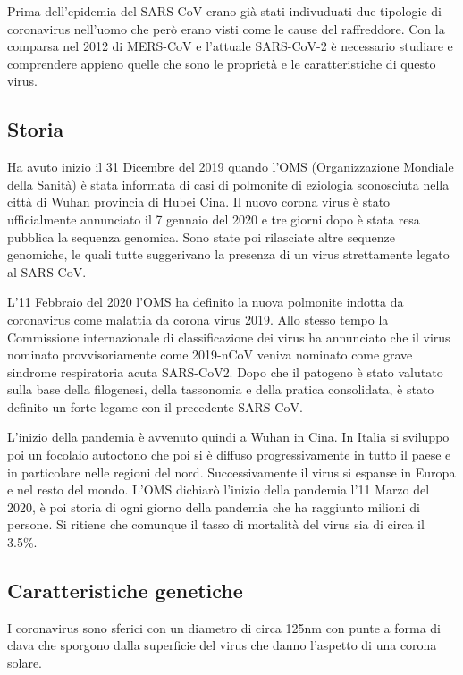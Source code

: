 Prima dell'epidemia del SARS-CoV erano già stati indivuduati due tipologie di coronavirus nell'uomo che però erano visti come le cause del raffreddore. Con la comparsa
nel 2012 di MERS-CoV e l'attuale SARS-CoV-2 è necessario studiare e comprendere appieno quelle che sono le proprietà e le caratteristiche di questo virus. 

\subsection{Storia}\label{subsec:es_subsec}
Ha avuto inizio il 31 Dicembre del 2019 quando l'OMS (Organizzazione Mondiale della Sanità) è stata informata di casi di polmonite di eziologia sconosciuta nella città di Wuhan provincia di Hubei Cina. Il nuovo corona virus è stato ufficialmente annunciato il 7 gennaio del 2020 e tre giorni dopo è stata resa pubblica la sequenza genomica. Sono state poi rilasciate altre sequenze genomiche, le quali tutte suggerivano la presenza di un virus strettamente legato al SARS-CoV. 

L'11 Febbraio del 2020 l'OMS ha definito la nuova polmonite indotta da coronavirus come malattia da corona virus 2019. Allo stesso tempo la Commissione internazionale di classificazione dei virus ha annunciato che il virus nominato provvisoriamente come 2019-nCoV veniva nominato come grave sindrome respiratoria acuta SARS-CoV2. Dopo che il patogeno è stato valutato sulla base della filogenesi, della tassonomia e della pratica consolidata, è stato definito un forte legame con il precedente SARS-CoV. 

L'inizio della pandemia è avvenuto quindi a Wuhan in Cina. In Italia si sviluppo poi un focolaio autoctono che poi si è diffuso progressivamente in tutto il paese e in particolare nelle regioni del nord. Successivamente il virus si espanse in Europa e nel resto del mondo. L'OMS dichiarò l'inizio della pandemia l'11 Marzo del 2020, è poi storia di ogni giorno della pandemia che ha raggiunto milioni di persone. Si ritiene che comunque il tasso di mortalità del virus sia di circa il 3.5\%.  

\subsection{Caratteristiche genetiche}\label{subsec:es_subsec}
I coronavirus sono sferici con un diametro di circa 125nm con punte a forma di clava che sporgono dalla superficie del virus che danno l'aspetto di una corona solare. 


